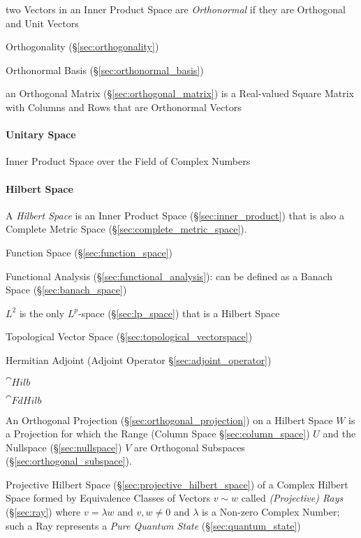 two Vectors in an Inner Product Space are \emph{Orthonormal} if they are
Orthogonal and Unit Vectors

\fist Orthogonality (\S\ref{sec:orthogonality})

\fist Orthonormal Basis (\S\ref{sec:orthonormal_basis})

an Orthogonal Matrix (\S\ref{sec:orthogonal_matrix}) is a Real-valued Square
Matrix with Columns and Rows that are Orthonormal Vectors



\paragraph{Unitary Space}\label{sec:unitary_space}\hfill

Inner Product Space over the Field of Complex Numbers



\paragraph{Hilbert Space}\label{sec:hilbert_space}\hfill


A \emph{Hilbert Space} is an Inner Product Space (\S\ref{sec:inner_product})
that is also a Complete Metric Space (\S\ref{sec:complete_metric_space}).

Function Space (\S\ref{sec:function_space})

Functional Analysis (\S\ref{sec:functional_analysis}): can be defined as a
Banach Space (\S\ref{sec:banach_space})

$L^2$ is the only $L^p$-space (\S\ref{sec:lp_space}) that is a Hilbert Space

Topological Vector Space (\S\ref{sec:topological_vectorspace})

Hermitian Adjoint (Adjoint Operator \S\ref{sec:adjoint_operator})

$\cat{Hilb}$

$\cat{FdHilb}$

An Orthogonal Projection (\S\ref{sec:orthogonal_projection}) on a Hilbert Space
$W$ is a Projection for which the Range (Column Space \S\ref{sec:column_space})
$U$ and the Nullspace (\S\ref{sec:nullspace}) $V$ are Orthogonal Subspaces
(\S\ref{sec:orthogonal_subspace}).

\fist Projective Hilbert Space (\S\ref{sec:projective_hilbert_space}) of a
Complex Hilbert Space formed by Equivalence Classes of Vectors $v \sim w$ called
\emph{(Projective) Rays} (\S\ref{sec:ray}) where $v = \lambda w$ and $v, w \neq
0$ and $\lambda$ is a Non-zero Complex Number; such a Ray represents a
\emph{Pure Quantum State} (\S\ref{sec:quantum_state})

